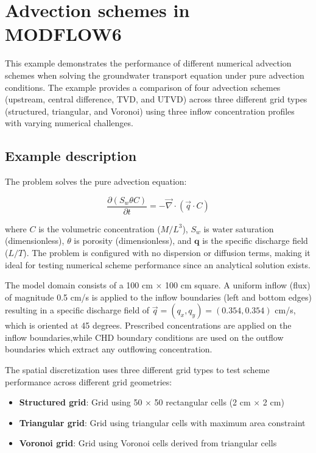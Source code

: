 \section{Advection schemes in MODFLOW6}

This example demonstrates the performance of different numerical advection schemes when solving the groundwater transport equation under pure advection conditions. The example provides a comparison of four advection schemes (upstream, central difference, TVD, and UTVD) across three different grid types (structured, triangular, and Voronoi) using three inflow concentration profiles with varying numerical challenges.

\subsection{Example description}

The problem solves the pure advection equation:

\begin{equation}
\frac{\partial \left(S_w \theta C\right)}{\partial t} = -\vec{\nabla} \cdot \left(\vec{q} \cdot C\right)
\label{eq:pureadvection}
\end{equation}

\noindent where $C$ is the volumetric concentration ($M/L^3$), $S_w$ is water saturation (dimensionless), $\theta$ is porosity (dimensionless), and $\mathbf{q}$ is the specific discharge field ($L/T$). The problem is configured with no dispersion or diffusion terms, making it ideal for testing numerical scheme performance since an analytical solution exists.

The model domain consists of a 100 cm $\times$ 100 cm square. A uniform inflow (flux) of magnitude 0.5 cm/s is applied to the inflow boundaries (left and bottom edges) resulting in a specific discharge field of $\vec{q} = (q_x, q_y) = (0.354, 0.354)$ cm/s, which is oriented at 45 degrees. Prescribed concentrations are applied on the inflow boundaries,while CHD boundary conditions are used on the outflow boundaries which extract any outflowing concentration.

The spatial discretization uses three different grid types to test scheme performance across different grid geometries:
\begin{itemize}
\item \textbf{Structured grid}: Grid using 50 $\times$ 50 rectangular cells (2 cm $\times$ 2 cm)
\item \textbf{Triangular grid}: Grid using triangular cells with maximum area constraint
\item \textbf{Voronoi grid}: Grid using Voronoi cells derived from triangular cells
\end{itemize}


